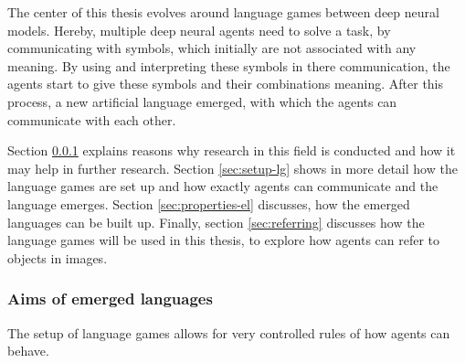 The center of this thesis evolves around language games between deep neural models.
Hereby, multiple deep neural agents need to solve a task, by communicating with symbols, which initially are not associated with any meaning.
By using and interpreting these symbols in there communication, the agents start to give these symbols and their combinations meaning.
After this process, a new artificial language emerged, with which the agents can communicate with each other.

Section \ref{sec:aims_languages} explains reasons why research in this field is conducted and how it may help in further research.
Section \ref{sec:setup-lg} shows in more detail how the language games are set up and how exactly agents can communicate and the language emerges.
Section \ref{sec:properties-el} discusses, how the emerged languages can be built up.
Finally, section \ref{sec:referring} discusses how the language games will be used in this thesis, to explore how agents can refer to objects in images.

\subsubsection{Aims of emerged languages}
\label{sec:aims_languages}
The setup of language games allows for very controlled rules of how agents can behave.


